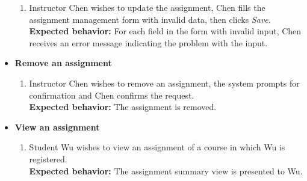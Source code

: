 \begin{itemize}
\begin{enumerate}
        \item Instructor Chen wishes to update the assignment, Chen fills the
            assignment management form with invalid data, then clicks \emph{Save}. \\
        {\bf Expected behavior:} For each field in the form with invalid input,
            Chen receives an error message indicating the problem with the
            input.
            \baselineskip
    \end{enumerate}

    \item \textbf{Remove an assignment} \begin{enumerate}
        \item Instructor Chen wishes to remove an assignment, the system
            prompts for confirmation and Chen confirms the request. \\
        {\bf Expected behavior:} The assignment is removed.
    \end{enumerate}

    \item \textbf{View an assignment} \begin{enumerate}
        \item Student Wu wishes to view an assignment of a course in which
            Wu is registered. \\
        {\bf Expected behavior:} The assignment summary view is presented to
            Wu.
    \end{enumerate}
\end{itemize}

